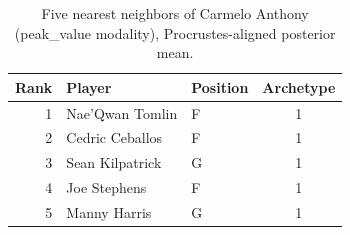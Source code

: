 \begin{table}[htbp]
  \centering\small
  \begin{tabular}{rllc}
    \toprule
    Rank & Player & Position & Archetype \\
    \midrule
    1 & Nae'Qwan Tomlin & F & 1 \\
    2 & Cedric Ceballos & F & 1 \\
    3 & Sean Kilpatrick & G & 1 \\
    4 & Joe Stephens & F & 1 \\
    5 & Manny Harris & G & 1 \\
    \bottomrule
  \end{tabular}
  \caption{Five nearest neighbors of Carmelo Anthony (peak_value modality), Procrustes-aligned posterior mean.}
  \label{tab:Carmelo_Anthony_neighbors_peak_value}
\end{table}

